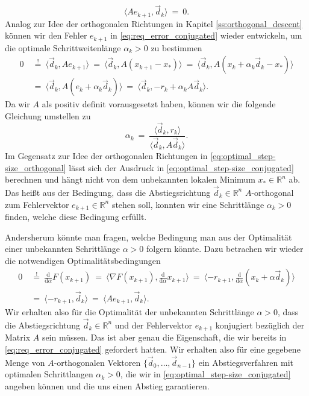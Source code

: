 \begin{equation}
\label{eq:req_error_conjugated}
\langle Ae_{k+1}, \vec{d}_k \rangle \ = \ 0.
\end{equation}
Analog zur Idee der orthogonalen Richtungen in Kapitel \ref{ss:orthogonal_descent} können wir den Fehler $e_{k+1}$ in \eqref{eq:req_error_conjugated} wieder entwickeln, um die optimale Schrittweitenlänge $\alpha_k > 0$ zu bestimmen
\begin{equation*}
\begin{split}
0 \ &\overset{!}{=} \ \langle \vec{d}_k, A e_{k+1} \rangle \ = \ \langle \vec{d}_k, A(x_{k+1} - x_*) \rangle \ = \ \langle \vec{d}_k, A(x_k + \alpha_k \vec{d}_k - x_*) \rangle \\
\ &= \ \langle \vec{d}_k, A(e_k + \alpha_k \vec{d}_k) \rangle \ = \ \langle \vec{d}_k, -r_k + \alpha_k A\vec{d}_k \rangle.
\end{split}
\end{equation*}
Da wir $A$ als positiv definit vorausgesetzt haben, können wir die folgende Gleichung umstellen zu
\begin{equation}
\label{eq:optimal_step-size_conjugated}
\alpha_k \ = \ \frac{\langle \vec{d}_k, r_k \rangle}{\langle \vec{d}_k, A \vec{d}_k \rangle}.
\end{equation}
Im Gegensatz zur Idee der orthogonalen Richtungen in \eqref{eq:optimal_step-size_orthogonal} lässt sich der Ausdruck in \eqref{eq:optimal_step-size_conjugated} berechnen und hängt nicht von dem unbekannten lokalen Minimum $x_* \in \mathbb{R}^n$ ab.
Das heißt aus der Bedingung, dass die Abstiegsrichtung $\vec{d}_k \in \mathbb{R}^n$ $A$-orthogonal zum Fehlervektor $e_{k+1} \in \mathbb{R}^n$ stehen soll, konnten wir eine Schrittlänge $\alpha_k > 0$ finden, welche diese Bedingung erfüllt.

Andersherum könnte man fragen, welche Bedingung man aus der Optimalität einer unbekannten Schrittlänge $\alpha > 0$ folgern könnte.
Dazu betrachen wir wieder die notwendigen Optimalitätsbedingungen
\begin{equation*}
\begin{split}
0 \ &\overset{!}{=} \ \frac{\mathrm{d}}{\mathrm{d}\alpha}F(x_{k+1}) \ = \ \langle  \nabla F(x_{k+1}), \frac{\mathrm{d}}{\mathrm{d}\alpha}x_{k+1} \rangle \ = \ \langle -r_{k+1}, \frac{\mathrm{d}}{\mathrm{d}\alpha} (x_k + \alpha \vec{d}_k) \rangle \\
\ &= \ \langle -r_{k+1}, \vec{d}_k \rangle \ = \ \langle Ae_{k+1}, \vec{d}_k \rangle.
\end{split}
\end{equation*}
Wir erhalten also für die Optimalität der unbekannten Schrittlänge $\alpha > 0$, dass die Abstiegsrichtung $\vec{d}_k \in \mathbb{R}^n$ und der Fehlervektor $e_{k+1}$ konjugiert bezüglich der Matrix $A$ sein müssen.
Das ist aber genau die Eigenschaft, die wir bereits in \eqref{eq:req_error_conjugated} gefordert hatten.
Wir erhalten also für eine gegebene Menge von $A$-orthogonalen Vektoren $\lbrace \vec{d}_0, \ldots, \vec{d}_{n-1} \rbrace$ ein Abstiegsverfahren mit optimalen Schrittlangen $\alpha_k > 0$, die wir in \eqref{eq:optimal_step-size_conjugated} angeben können und die uns einen Abstieg garantieren.

